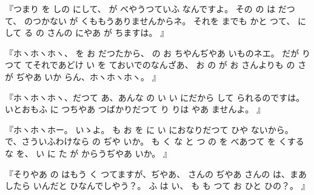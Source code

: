 『つまり
を
しの
にして、
が
べやうつていふ
なんですよ。
その
の
は
だつて、
のつかない
が
くももうありませんからネ。
それを
までも
かと
つて、
にして
る
の
さんの
にやあ
が
ちますは。
』

『ホヽホヽホヽ、
を
お
だつたから、
の
お
ちやんぢやあ
いものネエ。
だが
り
つて
てそれであどけ
い
を
ておいでのなんざあ、
お
の
が
お
さんよりも
の
さが
ぢやあ
いか
らん、ホヽホヽホヽ。
』

『ホヽホヽホヽ、だつて
あ、あんな
の
い
い
にだから
して
られるのですは。
いとおもふ
に
つちやあ
つばかりだつて
り
りは
やあ
ませんよ。
』

『ホヽホヽホー。
いゝよ。
も
お
を
に
い
におなりだつて
ひや
ないから。
で、さういふわけなら
の
ぢや
いか。
も
く
な
と
つ
の
を
べあつて
を
くする
な
を、
い
に
た
が
からうぢやあ
いか。
』

『そりやあ
の
はもう
く
つてますが、ぢやあ、
さんの
ぢやあ
さんの
は、まあ
したら
いんだと
ひなんでしやう？。
ふ
は
い、
も
も
つて
お
ひと
ひの？。
』

